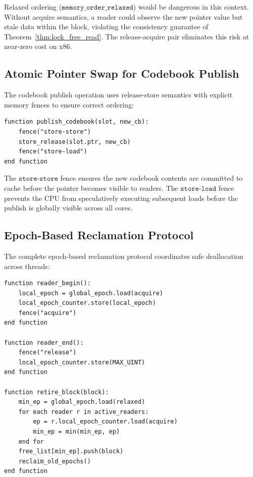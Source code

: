 Relaxed ordering ($\texttt{memory\_order\_relaxed}$) would be dangerous in this context. Without acquire semantics, a reader could observe the new pointer value but stale data within the block, violating the consistency guarantee of Theorem~\ref{thm:lock_free_read}. The release-acquire pair eliminates this risk at near-zero cost on x86.

\subsection{Atomic Pointer Swap for Codebook Publish}

The codebook publish operation uses release-store semantics with explicit memory fences to ensure correct ordering:

\begin{lstlisting}[language={},caption={Atomic codebook publish with memory fences}]
function publish_codebook(slot, new_cb):
    fence("store-store")
    store_release(slot.ptr, new_cb)
    fence("store-load")
end function
\end{lstlisting}

The $\texttt{store-store}$ fence ensures the new codebook contents are committed to cache before the pointer becomes visible to readers. The $\texttt{store-load}$ fence prevents the CPU from speculatively executing subsequent loads before the publish is globally visible across all cores.

\subsection{Epoch-Based Reclamation Protocol}

The complete epoch-based reclamation protocol coordinates safe deallocation across threads:

\begin{lstlisting}[language={},caption={Epoch-based safe memory reclamation}]
function reader_begin():
    local_epoch = global_epoch.load(acquire)
    local_epoch_counter.store(local_epoch)
    fence("acquire")
end function

function reader_end():
    fence("release")
    local_epoch_counter.store(MAX_UINT)
end function

function retire_block(block):
    min_ep = global_epoch.load(relaxed)
    for each reader r in active_readers:
        ep = r.local_epoch_counter.load(acquire)
        min_ep = min(min_ep, ep)
    end for
    free_list[min_ep].push(block)
    reclaim_old_epochs()
end function
\end{lstlisting}

